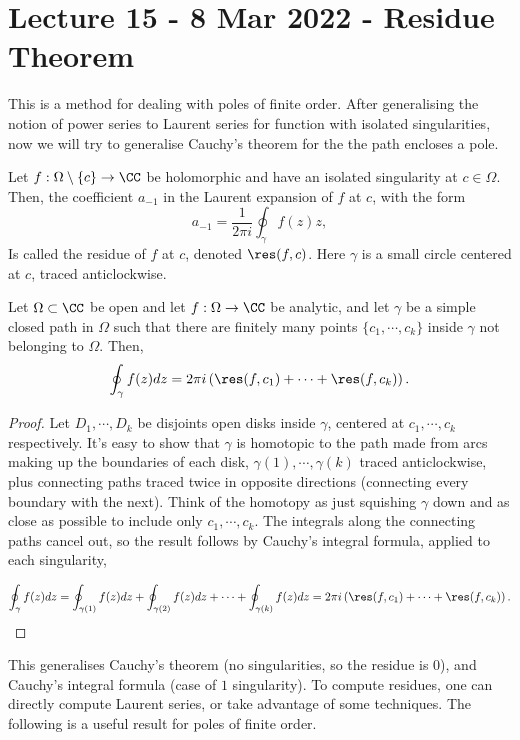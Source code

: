 \section{Lecture 15 - 8 Mar 2022 - Residue Theorem}
This is a method for dealing with poles of finite order. After generalising the
notion of power series to Laurent series for function with isolated
singularities, now we will try to generalise Cauchy's theorem for the the path
encloses a pole.
\begin{definition}
  Let $f:\Omega\setminus\{c\}\to\CC$ be holomorphic and have an isolated
  singularity at $c\in\Omega$. Then, the coefficient $a_{-1}$ in the Laurent
  expansion of $f$ at $c$, with the form
  \[a_{-1}=\frac{1}{2\pi i} \oint_{\gamma} f(z)z,\]
  Is called the residue of $f$ at $c$, denoted $\res(f, c)$. Here $\gamma$ is a
  small circle centered at $c$, traced anticlockwise.
  \label{def:residue}
\end{definition}
\begin{theorem}
  Let $\Omega\subset\CC$ be open and let $f:\Omega\to\CC$ be analytic, and let
  $\gamma$ be a simple closed path in $\Omega$ such that there are finitely many
  points $\{c_1,\cdots, c_k\}$ inside $\gamma$ not belonging to $\Omega$. Then,
  \[\oint_{\gamma} f(z)dz = 2\pi i \left( \res(f,c_1)+\cdots+\res(f,c_k)
  \right).\]
  \label{<+label+>}
\end{theorem}
\begin{proof}
  Let $D_1,\cdots, D_k$ be disjoints open disks inside $\gamma$, centered at
  $c_1,\cdots, c_k$ respectively. It's easy to show that $\gamma$ is homotopic
  to the path made from arcs making up the boundaries of each disk,
  $\gamma(1),\cdots, \gamma(k)$ traced anticlockwise, plus connecting paths
  traced twice in opposite directions (connecting every boundary with the next).
  Think of the homotopy as just squishing $\gamma$ down and as close as possible
  to include only $c_1,\cdots, c_k$. The integrals along the connecting paths
  cancel out, so the result follows by Cauchy's integral formula, applied to
  each singularity,
  
  \[\oint_{\gamma} f(z)dz = \oint_{\gamma(1)}f(z)dz + \oint_{\gamma(2)} f(z)dz
  +\cdots+ \oint_{\gamma(k)}f(z)dz = 2\pi i \left(
  \res(f,c_1)+\cdots+\res(f,c_k) \right).\]
\end{proof}
This generalises Cauchy's theorem (no singularities, so the residue is $0$), and
Cauchy's integral formula (case of $1$ singularity). To compute residues, one
can directly compute Laurent series, or take advantage of some techniques. The
following is a useful result for poles of finite order.

